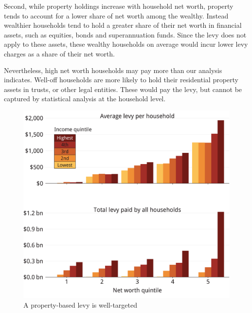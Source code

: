\documentclass[twoside,english]{palatinob5portrait}
\begin{document}
Second, while property holdings increase with household net worth, property tends to account for a lower share of net worth among the wealthy. Instead wealthier households tend to hold a greater share of their net worth in financial assets, such as equities, bonds and superannuation funds. Since the levy does not apply to these assets, these wealthy households on average would incur lower levy charges as a share of their net worth. 

Nevertheless, high net worth households may pay more than our analysis indicates. Well-off households are more likely to hold their residential property assets in trusts, or other legal entities. These would pay the levy, but cannot be captured by statistical analysis at the household level. 

\begin{figure}
\caption{A property-based levy is well-targeted\label{fig:PROP-11}}%
\includegraphics[width=\linewidth]{Property-taxes/atlas/figure/PROP-Figure11-1.pdf}

\end{figure}
\end{document}
